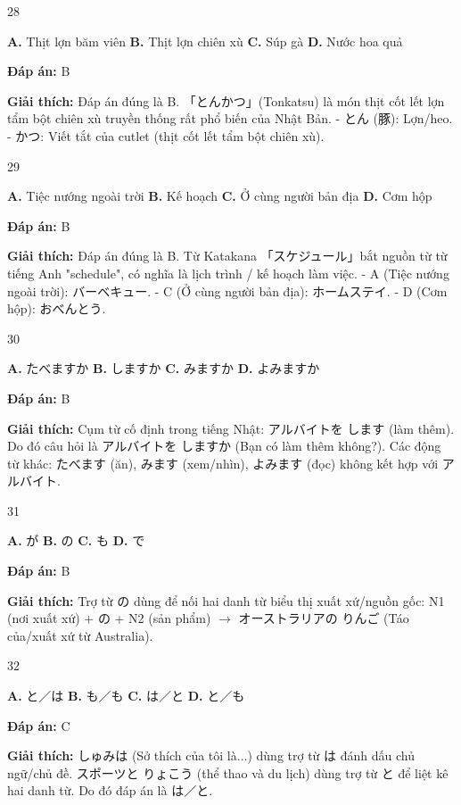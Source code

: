 \documentclass[12pt,a4paper]{report}
\newcommand{\source}[1]{}
\newcommand{\choice}[2]{\textbf{#1.} #2 \quad}
\newcommand{\answer}[1]{\par\textbf{Đáp án:} #1}
\newcommand{\confidence}[1]{}
\newcommand{\explain}[1]{\par\textbf{Giải thích:} #1\vspace{0.5cm}}
\begin{document}
\begin{question}{28}
\source{Q27.jpg}
\choice{A}{Thịt lợn băm viên}
\choice{B}{Thịt lợn chiên xù}
\choice{C}{Súp gà}
\choice{D}{Nước hoa quả}
\answer{B}
\confidence{high}
\explain{Đáp án đúng là B. 「とんかつ」(Tonkatsu) là món thịt cốt lết lợn tẩm bột chiên xù truyền thống rất phổ biến của Nhật Bản.
- とん (豚): Lợn/heo.
- かつ: Viết tắt của cutlet (thịt cốt lết tẩm bột chiên xù).}
\end{question}

\begin{question}{29}
\source{Q29.jpg}
\choice{A}{Tiệc nướng ngoài trời}
\choice{B}{Kế hoạch}
\choice{C}{Ở cùng người bản địa}
\choice{D}{Cơm hộp}
\answer{B}
\confidence{high}
\explain{Đáp án đúng là B. Từ Katakana 「スケジュール」bắt nguồn từ từ tiếng Anh "schedule", có nghĩa là lịch trình / kế hoạch làm việc.
- A (Tiệc nướng ngoài trời): バーベキュー.
- C (Ở cùng người bản địa): ホームステイ.
- D (Cơm hộp): おべんとう.}
\end{question}

\begin{question}{30}
\source{Q10.jpg}
\choice{A}{たべますか}
\choice{B}{しますか}
\choice{C}{みますか}
\choice{D}{よみますか}
\answer{B}
\confidence{high}
\explain{Cụm từ cố định trong tiếng Nhật: アルバイトを します (làm thêm). Do đó câu hỏi là アルバイトを しますか (Bạn có làm thêm không?). Các động từ khác: たべます (ăn), みます (xem/nhìn), よみます (đọc) không kết hợp với アルバイト.}
\end{question}

\begin{question}{31}
\source{Q11.jpg}
\choice{A}{が}
\choice{B}{の}
\choice{C}{も}
\choice{D}{で}
\answer{B}
\confidence{high}
\explain{Trợ từ の dùng để nối hai danh từ biểu thị xuất xứ/nguồn gốc: N1 (nơi xuất xứ) + の + N2 (sản phẩm) $\rightarrow$ オーストラリアの りんご (Táo của/xuất xứ từ Australia).}
\end{question}

\begin{question}{32}
\source{Q18.jpg}
\choice{A}{と／は}
\choice{B}{も／も}
\choice{C}{は／と}
\choice{D}{と／も}
\answer{C}
\confidence{high}
\explain{しゅみは (Sở thích của tôi là...) dùng trợ từ は đánh dấu chủ ngữ/chủ đề. スポーツと りょこう (thể thao và du lịch) dùng trợ từ と để liệt kê hai danh từ. Do đó đáp án là は／と.}
\end{question}
\end{document}
